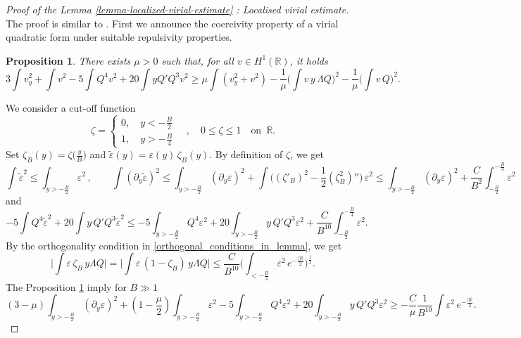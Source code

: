 \documentclass[16pt,english, oneside,reqno]{smfart}
\newcommand{\RR}{\mathbb{R}}
\renewcommand{\tilde}{\widetilde}
\newcommand{\vare}{{\varepsilon}}
\newtheorem{proposition}[theorem]{Proposition}
\begin{document}
\appendix
\section{}
\begin{proof}[Proof of the Lemma \ref{lemma-localized-virial-estimate} : Localised virial estimate]
The proof is similar to \cite[Lemma 3.5]{Combet-Martel-17}. First we announce the coercivity property of a virial quadratic form under suitable repulsivity properties.
\begin{proposition}{\cite[Proposition 4]{Martel-Merle-00}}\label{Prop_Martel_Merle00}  There exists $\mu>0$ such that, for all $v\in H^1(\RR)$, it holds
    \begin{equation}
        3\int v^2_y + \int v^2 - 5\int Q^4 v^2 + 20 \int y Q' Q^3 v^2 \geq \mu \int (v^2_y + v^2) - \frac{1}{\mu}\Big( \int v\, y \, \Lambda Q\Big)^2 - \frac{1}{\mu} \Big( \int v\, Q \Big)^2.
    \end{equation}
\end{proposition}

\vspace{0.4cm}
We consider a cut-off function 
\begin{equation}
    \zeta = \begin{cases}
        0, \quad y<-\frac B 2\\
        1, \quad y>-\frac B 4
    \end{cases} \quad , \quad 0\leq \zeta \leq 1 \quad \text{on}\;\ \RR.
\end{equation}
Set $\zeta_B(y) = \zeta\big( \frac{y}{B}\big)$ and $\tilde{\vare}(y) = \vare(y)\,\zeta_B(y)$.
By definition of $\zeta$, we get
\begin{equation}
    \int \tilde{\vare}^2 \leq \int_{y>-\frac B2} \vare^2\,, \qquad \int (\partial_y \tilde{\vare})^2 \leq \int_{y>-\frac B2}(\partial_y \vare)^2 + \int \big( (\zeta'_B)^2 - \frac{1}{2}(\zeta^2_B)'' \big) \, \vare^2 \leq \int_{y>-\frac B2} (\partial_y \vare)^2 + \frac{C}{B^2} \int_{-\frac B2}^{-\frac B 4} \vare^2
\end{equation}
and
\begin{equation}
    -5\int Q^4 \tilde{\vare}^2 + 20\int y\, Q'Q^3 \tilde{\vare}^2 \leq -5\int_{y>-\frac B2} Q^4 \vare^2  + 20 \int_{y>-\frac B2} y\, Q'Q^3 \vare^2  + \frac{C}{B^{10}} \int_{-\frac B2}^{-\frac B 4}\vare^2.
\end{equation}
By the orthogonality condition in \eqref{orthogonal_conditions_in_lemma}, we get
\begin{equation}
    \Big| \int \vare \, \zeta_B \, y \Lambda Q \Big| = \Big| \int \vare\, (1-\zeta_B)\,y \Lambda Q \Big| \leq \frac{C}{B^{10}}\Big(\int_{<-\frac B 4} \vare^2 \, e^{-\frac{|y|}{2}} \Big)^{\frac 12}.
\end{equation}
The Proposition \ref{Prop_Martel_Merle00} imply for $B \gg 1$
\begin{equation}
    (3-\mu)\int_{y>-\frac B2} (\partial_y \vare)^2 + (1 - \frac \mu 2)\int_{y>-\frac B2} \vare^2 - 5\int_{y>-\frac B2} Q^4 \vare^2 + 20 \int_{y>-\frac B2} y \, Q' Q^3 \vare^2  \geq -\frac C\mu \frac{1}{B^{10}}\int \vare^2 \,e^{-\frac{|y|}{2}}.
\end{equation}
\end{proof}
\printbibliography
\end{document}

